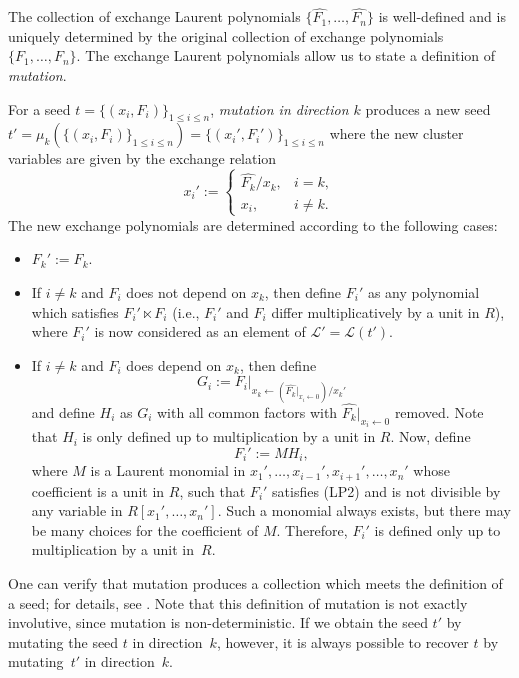 \documentclass[10pt,a4paper]{amsart}
\numberwithin{equation}{section}
\begin{document}
The collection of exchange Laurent polynomials $\big\{ \hat{F_1}, \dots, \hat{F_n} \big\}$ is well-defined and is uniquely determined by the original collection of exchange polynomials $\{ F_1,\dots,F_n \}$. The exchange Laurent polynomials allow us to state a definition of \emph{mutation}.
\begin{Definition}
For a seed $t = \{ (x_i,F_i) \}_{1 \leq i \leq n}$, \emph{mutation in direction $k$} produces a new seed $t' = \mu_k(\{ (x_i,F_i) \}_{1 \leq i \leq n}) = \{ (x_i',F_i') \}_{1 \leq i \leq n}$ where the new cluster variables are given by the exchange relation
 \[
 x_i' := \begin{cases} \hat{F_k}/x_k, & i = k, \\ x_i, & i \neq k. \end{cases}
 \]
The new exchange polynomials are determined according to the following cases:
 \begin{itemize}\itemsep=0pt
 \item $F_k' := F_k$.
 \item If $i \neq k$ and $F_i$ does not depend on $x_k$, then define $F_i'$ as any polynomial which satisfies $F_i' \ltimes F_i$ (i.e., $F_i'$ and $F_i$ differ multiplicatively by a unit in $R$), where $F_i'$ is now considered as an element of $\mathcal{L}' = \mathcal{L}(t')$.
 \item If $i \neq k$ and $F_i$ does depend on $x_k$, then define
 \[ G_i := F_i\big|_{x_k \leftarrow (\hat{F_k}|_{x_i \leftarrow 0})/x_k'} \]
 and define $H_i$ as $G_i$ with all common factors with $ \hat{F_k}\big|_{x_i \leftarrow 0}$ removed. Note that $H_i$ is only defined up to multiplication by a unit in $R$. Now, define
 \[ F_i' := MH_i, \]
 where $M$ is a Laurent monomial in $x_1', \dots, x_{i-1}', x_{i+1}', \dots, x_n'$ whose coefficient is a unit in $R$, such that $F_i'$ satisfies (LP2) and is not divisible by any variable in $R[x_1',\dots,x_n']$. Such a monomial always exists, but there may be many choices for the coefficient of $M$. Therefore, $F_i'$ is defined only up to multiplication by a unit in~$R$.
 \end{itemize}
\end{Definition}
One can verify that mutation produces a collection which meets the definition of a seed; for details, see \cite[Section~2.2]{LP-12}. Note that this definition of mutation is not exactly involutive, since mutation is non-deterministic. If we obtain the seed $t'$ by mutating the seed $t$ in direction~$k$, however, it is always possible to recover $t$ by mutating~$t'$ in direction~$k$.
\end{document}
